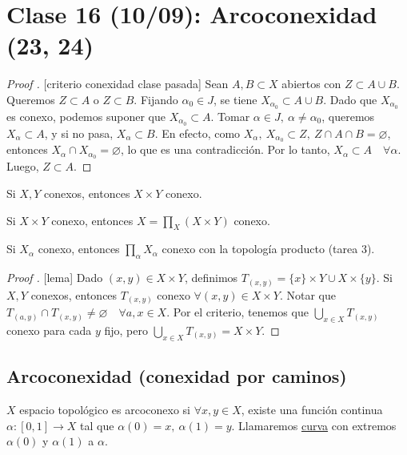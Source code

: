\section{Clase 16 (10/09): Arcoconexidad (23, 24)}

\begin{proof}[Proof ][criterio conexidad clase pasada]
	Sean $A,B \subset X$ abiertos con $Z \subset A \cup B$. Queremos $Z \subset A$ o $Z \subset B$. Fijando $\alpha_{0} \in J$, se tiene $X_{\alpha_{0}} \subset A \cup B$. Dado que $X_{\alpha_{0}}$ es conexo, podemos suponer que $X_{\alpha_{0}} \subset A$. Tomar $\alpha \in J,\ \alpha \neq \alpha_{0}$, queremos $X_{\alpha} \subset A$, y si no pasa, $X_{\alpha} \subset B$. En efecto, como $X_{\alpha},\ X_{\alpha_{0}} \subset Z,\ Z \cap A \cap B = \varnothing$, entonces $X_{\alpha} \cap X_{\alpha_{0}} = \varnothing$, lo que es una contradicción. Por lo tanto, $X_{\alpha} \subset A \quad \forall \alpha$. Luego, $Z \subset A$.
\end{proof}

\begin{lemma}
	Si $X,Y$ conexos, entonces $X \times Y$ conexo.
\end{lemma}

\begin{observe}
	Si $X \times Y$ conexo, entonces $X = \prod_{X} (X \times Y)$ conexo.
\end{observe}

\begin{observe}
	Si $X_{\alpha}$ conexo, entonces $\prod_{\alpha} X_{\alpha}$ conexo con la topología producto (tarea 3).
\end{observe}

\begin{proof}[Proof ][lema]
	Dado $(x,y) \in X \times Y$, definimos $T_{(x,y)} = \{x\} \times Y \cup X \times \{y\}$. Si $X,Y$ conexos, entonces $T_{(x,y)}$ conexo $\forall (x,y) \in X \times Y$. Notar que $T_{(a,y)} \cap T_{(x,y)} \neq \varnothing \quad \forall a,x \in X$. Por el criterio, tenemos que $\bigcup_{x\in X} T_{(x,y)}$ conexo para cada $y$ fijo, pero $\bigcup_{x \in X} T_{(x,y)} = X \times Y$.
\end{proof}

\subsection{Arcoconexidad (conexidad por caminos)}

\begin{definition}[curva]
	$X$ espacio topológico es arcoconexo si $\forall x,y \in X$, existe una función continua $\alpha : [0,1] \to X$ tal que $\alpha(0) = x,\ \alpha(1) = y$. Llamaremos \underline{curva} con extremos $\alpha(0)$ y $\alpha(1)$ a $\alpha$.
\end{definition}

